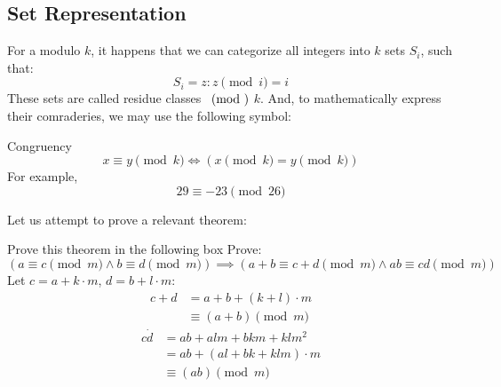 \subsection{Set Representation}
For a modulo $k$, it happens that we can categorize all integers into $k$ sets $S_i$, such that:
\[S_i = {z : z\pmod{i} = i} \]
These sets are called residue classes $\pmod$ $k$. And, to mathematically express their comraderies, we may use the following symbol:
\begin{ln-symbol}{Congruency}{}
    \[x \equiv y\pmod{k} \iff (x\pmod{k} = y\pmod{k}) \]
    For example,
    \[29 \equiv -23\pmod{26}\]
\end{ln-symbol}
Let us attempt to prove a relevant theorem:
\begin{ln-think}{Prove this theorem in the following box}{}
    Prove:
    \[(a \equiv c\pmod{m} \land b \equiv d\pmod{m}) \implies (a + b \equiv c + d\pmod{m} \land ab \equiv cd\pmod{m})\]
    \tcblower
    Let $c = a + k \cdot m$, $d = b + l \cdot m$:
    \begin{align*}
        c + d
        &= a + b + (k + l) \cdot m \\
        &\equiv (a + b)\pmod{m}
    \end{align*}
    \begin{align*}
        c \dot d
        &= ab + alm + bkm + klm^2 \\
        &= ab + (al + bk + klm) \cdot m \\
        &\equiv (ab)\pmod{m}
    \end{align*}
\end{ln-think}

